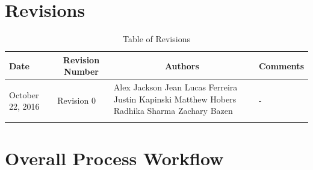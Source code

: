 \documentclass [12pt]{article}
\begin{document}

\pagebreak

\tableofcontents
\listoftables

\pagebreak


\section{Revisions}
\begin{longtable}{| p{ } | p{ } | p{ } | p{ } |}

\hline 
\centering \textbf{Date} & 
\multicolumn{1}{c}{\textbf {Revision Number}} &
\multicolumn{1}{|c}{\textbf {Authors}} & 
\multicolumn{1}{|c|}{\textbf {Comments}} \\ \hline

\multirow{4}{*}{\centering October 22, 2016}  & 
\multirow{4}{*}{Revision 0}& 
{Alex Jackson \newline
Jean Lucas Ferreira \newline
Justin Kapinski\newline
Matthew Hobers\newline
Radhika Sharma\newline
Zachary Bazen}
&
\multirow{4}{*}{-} \\ 
\hline 

\caption{Table of Revisions} 
\end{longtable}








\pagebreak


\section{Overall Process Workflow}
\end{document}
